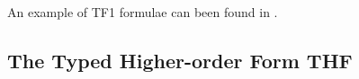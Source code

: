 \documentclass{easychair}
\begin{document}
An example of TF1 formulae can been found in \cite{KSR16}.
% 
% 
% 
% 

\subsection{The Typed Higher-order Form THF}
\label{THF}
\end{document}
